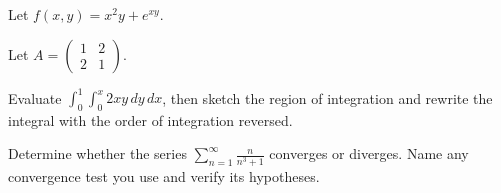 \documentclass[11pt,addpoints]{exam}
\begin{document}
\vspace{1em}
\begin{questions}

\question[10]
Let $f(x, y) = x^2 y + e^{xy}$.

\question[10]
Let $A = \begin{pmatrix} 1 & 2 \\ 2 & 1 \end{pmatrix}$.

\question[10]
Evaluate $\displaystyle\int_0^{1}\!\!\int_0^{x} 2xy \,dy\,dx$, then sketch
the region of integration and rewrite the integral with the order of
integration reversed.

\question[10]
Determine whether the series
$\displaystyle\sum_{n=1}^{\infty} \frac{n}{n^3 + 1}$ converges or diverges.
Name any convergence test you use and verify its hypotheses.

\end{questions}
\end{document}
